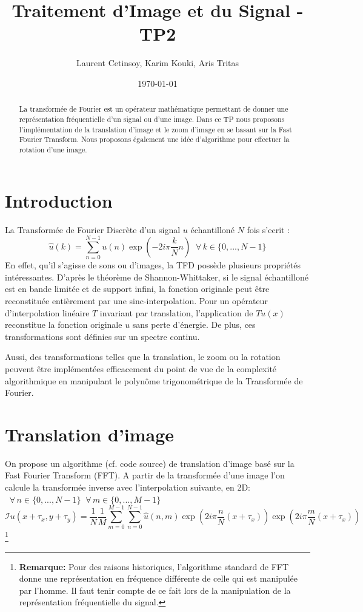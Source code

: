 \documentclass[12pt]{article}
\title{Traitement d'Image et du Signal - TP2}
\author{Laurent Cetinsoy, Karim Kouki, Aris Tritas }
\date{\today}
\begin{document}
\maketitle

\begin{abstract}
La transformée de Fourier est un opérateur mathématique permettant de donner une représentation fréquentielle d'un signal ou d'une image. 
Dans ce TP nous proposons l'implémentation de la translation d'image et le zoom d'image en se basant sur la Fast Fourier Transform. Nous proposons également une idée d'algorithme pour effectuer la rotation d'une image.
\end{abstract}

\section*{Introduction}

La Transformée de Fourier Discrète d'un signal $u$ échantilloné $N$ fois s'ecrit :
\begin{equation*}
\hat{u}(k) = \sum_{n=0}^{N-1} u(n)\exp(-2 i \pi \frac{k}{N}n) \;\; \forall \, k \in \{0, ... ,N-1\}
\end{equation*}
En effet, qu'il s'agisse de sons ou d'images, la TFD possède plusieurs propriétés intéressantes. D'après le théorème de Shannon-Whittaker, si le signal échantilloné est en bande limitée et de support infini, la fonction originale peut être reconstituée entièrement par une sinc-interpolation. \newline Pour un opérateur d'interpolation linéaire $T$ invariant par translation, l'application de $Tu(x)$ reconstitue la fonction originale $u$ sans perte d'énergie. De plus, ces transformations sont définies sur un spectre continu.

Aussi, des transformations telles que la translation, le zoom ou la rotation peuvent être implémentées efficacement du point de vue de la complexité algorithmique en manipulant le polynôme trigonométrique de la Transformée de Fourier. 

\section*{Translation d'image}

On propose un algorithme (cf. code source) de translation d'image basé sur la Fast Fourier Transform (FFT). A partir de la transformée d'une image l'on calcule la transformée inverse avec l'interpolation suivante, en 2D: $\;\;\forall \, n \in \{0, ... ,N-1\}\; \; \forall \, m \in \{0, ... ,M-1\}$ 
\begin{equation*}
\mathcal{I}u(x + \tau_x, y + \tau_y) = \frac{1}{N} \frac{1}{M} \sum_{m=0}^{M-1} \sum_{n=0}^{N-1} \hat{u}(n, m)\exp(2 i \pi \frac{n}{N}(x + \tau_x)) \exp(2 i \pi \frac{m}{N}(x + \tau_x)) \;\; 
\end{equation*}
\footnote{\textbf{Remarque:} Pour des raisons historiques, l'algorithme standard de FFT donne une représentation en fréquence différente de celle qui est manipulée par l'homme. Il faut tenir compte de ce fait lors de la manipulation de la représentation fréquentielle du signal.}
\end{document}
